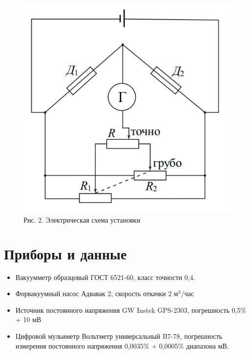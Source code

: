\documentclass[a4paper]{article}
\begin{document}
\begin{figure}[h!]
\begin{minipage}{0.48\textwidth}
        \centering
        \includegraphics[width=\linewidth]{Pictures/scheme.png}
        \caption{Рис. 2. Электрическая схема установки}
        \label{fig:scheme}
    \end{minipage}
\end{figure}

\section{Приборы и данные}
\begin{itemize}
    \item Вакуумметр образцовый ГОСТ 6521-60, класс точности 0,4.
    \item Форвакуумный насос Адвавак 2, скорость откачки 2 м$^3$/час
	\item Источник постоянного напряжения GW Instek GPS-2303, погрешность 0,5\% + 10 мВ
	\item Цифровой мульиметр Вольтметр универсальный B7-78, погрешность измерения постоянного напряжения 0,0035\% + 0,0005\% диапазона мВ. 
\end{itemize}
\end{document}
